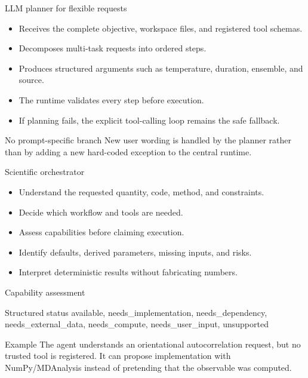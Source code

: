 \documentclass[aspectratio=169,11pt]{beamer}
\begin{document}
\begin{frame}{LLM planner for flexible requests}
\begin{itemize}
  \item Receives the complete objective, workspace files, and registered tool schemas.
  \item Decomposes multi-task requests into ordered steps.
  \item Produces structured arguments such as temperature, duration, ensemble, and source.
  \item The runtime validates every step before execution.
  \item If planning fails, the explicit tool-calling loop remains the safe fallback.
\end{itemize}
\begin{alertblock}{No prompt-specific branch}
New user wording is handled by the planner rather than by adding a new hard-coded
exception to the central runtime.
\end{alertblock}
\end{frame}

\begin{frame}{Scientific orchestrator}
\begin{itemize}
  \item Understand the requested quantity, code, method, and constraints.
  \item Decide which workflow and tools are needed.
  \item Assess capabilities before claiming execution.
  \item Identify defaults, derived parameters, missing inputs, and risks.
  \item Interpret deterministic results without fabricating numbers.
\end{itemize}
\end{frame}

\begin{frame}{Capability assessment}
\begin{block}{Structured status}
available, needs\_implementation, needs\_dependency, needs\_external\_data,
needs\_compute, needs\_user\_input, unsupported
\end{block}
\begin{exampleblock}{Example}
The agent understands an orientational autocorrelation request, but no trusted tool is
registered. It can propose implementation with NumPy/MDAnalysis instead of pretending
that the observable was computed.
\end{exampleblock}
\end{frame}
\end{document}
